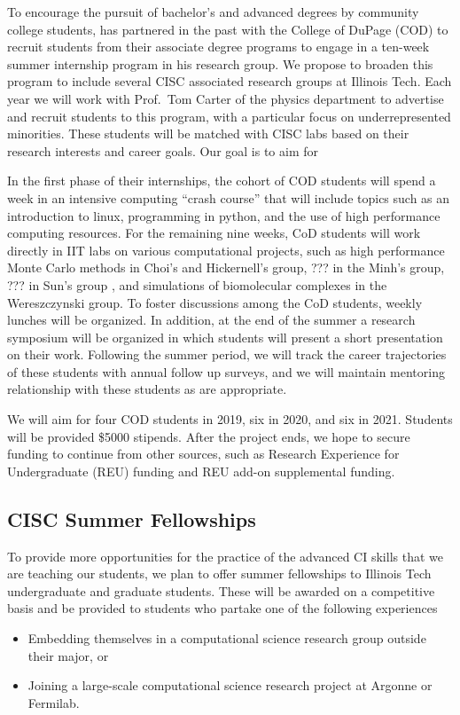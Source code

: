 \documentclass[11pt]{NSFamsart}
\begin{document}
To  encourage the pursuit of bachelor's and advanced degrees by community college students, \JW has partnered in the past with the College of DuPage (COD) to recruit students from their associate degree programs  to engage in a ten-week summer internship program in his research group.  We propose to broaden this program to include several CISC associated research groups at Illinois Tech. Each year we will work with Prof.~Tom Carter of the physics department to advertise and recruit students to this program,  with a particular focus on underrepresented minorities.  These students will be matched with CISC labs based on their research interests and career goals.  Our goal is to aim for 

In the first phase of their internships, the cohort of COD students will spend a week in an intensive computing ``crash course'' that will include topics such as an introduction to linux, programming in python, and the use of high performance computing resources.  For the remaining nine weeks, CoD students will work directly in IIT labs on various computational projects, such as high performance Monte Carlo methods in Choi's and Hickernell's group, ??? in the Minh's group, ??? in Sun's group , and simulations of biomolecular complexes in the Wereszczynski group.  To foster discussions among the CoD students, weekly lunches will be organized.  In addition, at the end of the summer a research symposium will be organized in which students will present a short presentation on their work.  Following the summer period, we will track the career trajectories of these students with annual follow up surveys, and we will maintain mentoring relationship with these students as are appropriate. 

We will aim for four COD students in 2019, six in 2020, and six in 2021.  Students will be provided \$5000 stipends.  After the project ends, we hope to secure funding to continue from other sources, such as Research Experience for Undergraduate (REU) funding and REU add-on supplemental funding.


\subsection{CISC Summer Fellowships} \label{Fellow}
To provide more opportunities for the practice of the advanced CI skills that we are teaching our students, we plan to offer summer fellowships to Illinois Tech undergraduate and graduate students.  These will be awarded on a competitive basis and be provided to students who partake one of the following experiences
\begin{itemize}
\item Embedding themselves in a computational science research group outside their major, or
\item Joining a large-scale computational science research project at Argonne or Fermilab.
\end{itemize}
\end{document}
